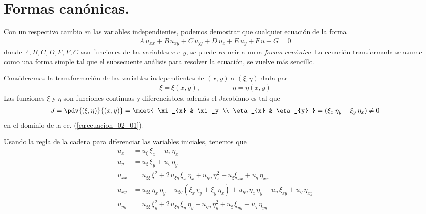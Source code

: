 \section{Formas canónicas.}
Con un respectivo cambio en las variables independientes, podemos demostrar que cualquier ecuación de la forma
\begin{align}
A \, u_{xx} + B \, u_{xy} + C \, u_{yy} + D \, u_{x} + E \, u_{y} + F \, u + G = 0
\label{eq:ecuacion_02_01}    
\end{align}
donde $A, B, C, D, E, F, G$ son funciones de las variables $x$ e $y$, se puede reducir a uuna \emph{forma canónica}. La ecuación transformada se asume como una forma simple tal que el subsecuente análisis para resolver la ecuación, se vuelve más sencillo.
\par
Consideremos la transformación de las variables independientes de $(x, y)$ a $(\xi, \eta)$ dada por
\begin{align}
\xi = \xi (x, y), \hspace{2cm} \eta = \eta (x, y)
\label{eq:ecuacion_02_02}
\end{align}
Las funciones $\xi$ y $\eta$ son funciones continuas y diferenciables, además el Jacobiano es tal que
\begin{align}
J = \pdv{(\xi, \eta)}{(x, y)} = \mdet{
\xi_{x} & \xi_y \\
\eta_{x} & \eta_{y}
} =
(\xi_{x} \, \eta_{y} - \xi_{y} \, \eta_{x}) \neq 0
\label{eq:ecuacion_02_03}    
\end{align}
en el dominio de la ec. (\ref{eq:ecuacion_02_01}).
\par
Usando la regla de la cadena para diferenciar las variables iniciales, tenemos que
\begin{align*}
u_{x} &= u_{\xi} \, \xi_{x} + u_{\eta} \, \eta_{x} \\
u_{y} &= u_{\xi} \, \xi_{y} + u_{\eta} \, \eta_{y} \\
u_{xx} &= u_{\xi \xi} \, \xi^{2} + 2 \, u_{\xi \eta} \, \xi_{x} \, \eta_{x} + u_{\eta \eta} \, \eta_{x}^{2} + u_{\xi} \xi_{x x} + u_{\eta} \, \eta_{xx} \\
u_{xy} &= u_{\xi \xi} \, \eta_{x} \, \eta_{y} + u_{\xi \eta} (\xi_{x} \, \eta_{y} + \xi_{y} \, \eta_{x}) + u_{\eta \eta} \, \eta_{x} \, \eta_{y} + u_{\eta} \, \xi_{x y} + u_{\eta} \, \eta_{x y} \\
u_{yy} &= u_{\xi \xi} \, \xi_{y}^{2} + 2 \, u_{\xi \eta} \, \xi_{y} \, \eta_{y} + u_{\eta \eta} \, \eta_{y}^{2} + u_{\xi} \, \xi_{y y} + u_{\eta} \, \eta_{yy}
\end{align*}
